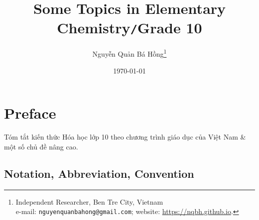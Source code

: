 \documentclass[oneside]{book}
\title{Some Topics in Elementary Chemistry\texttt{/}Grade 10}
\author{Nguyễn Quản Bá Hồng\footnote{Independent Researcher, Ben Tre City, Vietnam\\e-mail: \texttt{nguyenquanbahong@gmail.com}; website: \url{https://nqbh.github.io}.}}
\date{\today}
\numberwithin{equation}{section}
\begin{document}
\frontmatter
\maketitle
\setcounter{secnumdepth}{4}
\setcounter{tocdepth}{3}
\tableofcontents
\newpage


\mainmatter

\chapter*{Preface}

Tóm tắt kiến thức Hóa học lớp 10 theo chương trình giáo dục của Việt Nam \& một số chủ đề nâng cao.

\section*{Notation, Abbreviation, Convention}
\end{document}
